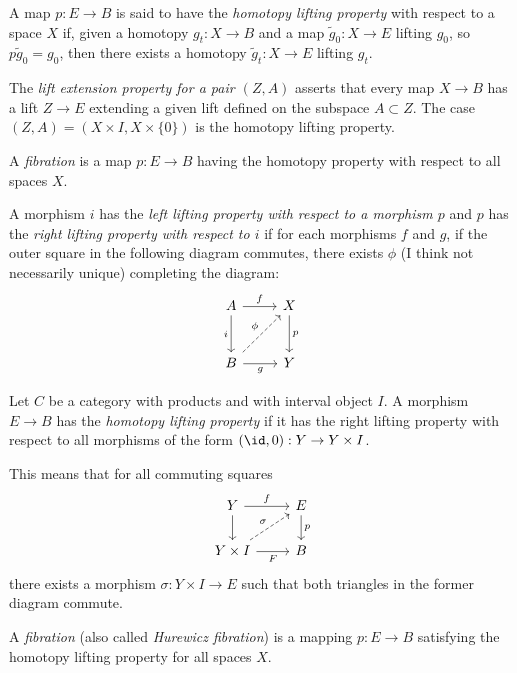 \begin{definition}[Hatcher]
A map $p:E\to B$ is said to have the {\it homotopy lifting property} with respect to a space $X$ if, given a homotopy $g_t:X\to B$ and a map $\tilde{g}_0:X\to E$ lifting $g_0$, so $p\tilde{g}_0=g_0$, then there exists a homotopy $\tilde{g}_t:X\to E$ lifting $g_t$.
	
The {\it lift extension property for a pair $(Z,A)$} asserts that every map $X\to B$ has a lift $Z\to E$ extending a given lift defined on the subspace $A\subset Z$. The case $(Z,A)=(X\times I,X\times\{0\})$ is the homotopy lifting property.
	
A {\it fibration} is a map $p:E\to B$ having the homotopy property with respect to all spaces $X$.
\end{definition}

\begin{definition}
	A morphism $i$ has the {\it left lifting property with respect to a morphism $p$} and $p$ has the {\it right lifting property with respect to $i$} if for each morphisms $f$ and $g$, if the outer square in the following diagram commutes, there exists $\phi$ (I think not necessarily unique) completing the diagram:
	$$\begin{tikzcd}[row sep=large]
		A\arrow[r,"f"]\arrow[d,"i",swap]&X\arrow[d,"p"]\\
		B\arrow[r,"g",swap]\arrow[ur,dashed,"\phi"]&Y
	\end{tikzcd}$$
\end{definition}

\begin{definition} Let $C$ be a category with products and with interval object $I$. A morphism $E\to B$ has the {\it homotopy lifting property} if it has the right lifting property with respect to all morphisms of the form $(\id,0):Y\to Y\times I$.
	
	This means that for all commuting squares
	$$\begin{tikzcd}
		Y\arrow[r,"f"]\arrow[d]&E\arrow[d,"p"]\\
		Y\times I\arrow[r,swap,"F"]\arrow[ur,dashed,"\sigma"]&B
	\end{tikzcd}$$
	there exists a morphism $\sigma:Y\times I\to E$ such that both triangles in the former diagram commute.
	
	A {\it fibration} (also called {\it Hurewicz fibration}) is a mapping $p:E\to B$ satisfying the homotopy lifting property for all spaces $X$.
\end{definition}

